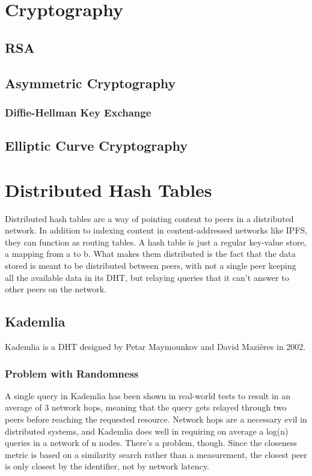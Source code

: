 \chapter{Cryptography}
\label{Cryptography}

\section{RSA}

\section{Asymmetric Cryptography}
\subsection{Diffie-Hellman Key Exchange}


\section{Elliptic Curve Cryptography}

\chapter{Distributed Hash Tables}
\label{DHT}
Distributed hash tables are a way of pointing content to peers in a distributed network. In addition to indexing content in content-addressed networks like IPFS, they can function as routing tables. A hash table is just a regular key-value store, a mapping from a to b. What makes them distributed is the fact that the data stored is meant to be distributed between peers, with not a single peer keeping all the available data in its DHT, but relaying queries that it can't answer to other peers on the network.

\section{Kademlia}
Kademlia is a DHT designed by Petar Maymounkov and David Mazières in 2002.
\subsection{Problem with Randomness}
A single query in Kademlia has been shown in real-world tests to result in an average of 3 network hops, meaning that the query gets relayed through two peers before reaching the requested resource.\cite{roos_comprehending_2013} Network hops are a necessary evil in distributed systems, and Kademlia does well in requiring on average a log(n) queries in a network of n nodes. There's a problem, though. Since the closeness metric is based on a similarity search rather than a measurement, the closest peer is only closest by the identifier, not by network latency.
